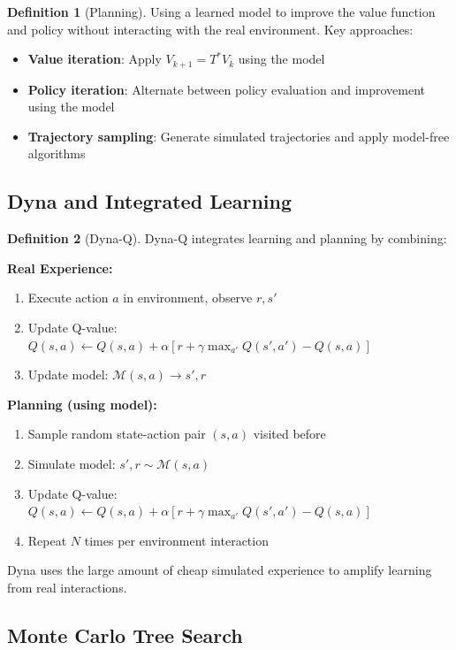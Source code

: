 \documentclass[12pt,a4paper]{article}
\theoremstyle{definition}
\newtheorem{definition}{Definition}[section]
\begin{document}
\begin{definition}[Planning]
Using a learned model to improve the value function and policy without interacting with the real environment. Key approaches:
\begin{itemize}
    \item \textbf{Value iteration}: Apply $V_{k+1} = T^* V_k$ using the model
    \item \textbf{Policy iteration}: Alternate between policy evaluation and improvement using the model
    \item \textbf{Trajectory sampling}: Generate simulated trajectories and apply model-free algorithms
\end{itemize}
\end{definition}

\subsection{Dyna and Integrated Learning}

\begin{definition}[Dyna-Q]
Dyna-Q integrates learning and planning by combining:

\textbf{Real Experience:}
\begin{enumerate}
    \item Execute action $a$ in environment, observe $r, s'$
    \item Update Q-value: $Q(s, a) \leftarrow Q(s, a) + \alpha[r + \gamma \max_{a'} Q(s', a') - Q(s, a)]$
    \item Update model: $\mathcal{M}(s, a) \rightarrow s', r$
\end{enumerate}

\textbf{Planning (using model):}
\begin{enumerate}
    \item Sample random state-action pair $(s, a)$ visited before
    \item Simulate model: $s', r \sim \mathcal{M}(s, a)$
    \item Update Q-value: $Q(s, a) \leftarrow Q(s, a) + \alpha[r + \gamma \max_{a'} Q(s', a') - Q(s, a)]$
    \item Repeat $N$ times per environment interaction
\end{enumerate}

Dyna uses the large amount of cheap simulated experience to amplify learning from real interactions.
\end{definition}

\subsection{Monte Carlo Tree Search}
\end{document}
